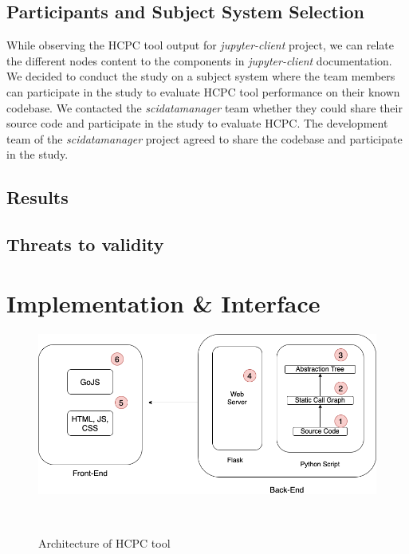 \subsection{Participants and Subject System Selection}
While observing the HCPC tool output for \emph{jupyter-client} project, we can relate the different nodes content to the components in \emph{jupyter-client} documentation. We decided to conduct the study on a subject system where the team members can participate in the study to evaluate HCPC tool performance on their known codebase. We contacted the \emph{scidatamanager} team whether they could share their source code and participate in the study to evaluate HCPC. The development team of the \emph{scidatamanager} project agreed to share the codebase and participate in the study. 
\subsection{Results}

\subsection{Threats to validity}

\section{Implementation \& Interface}

\begin{figure}[h]
  \centering
  \includegraphics[width=\columnwidth]{figures/hla3/hla3_implementation.png}
  \caption{Architecture of HCPC tool }~\label{fig:architecture}
\end{figure}


